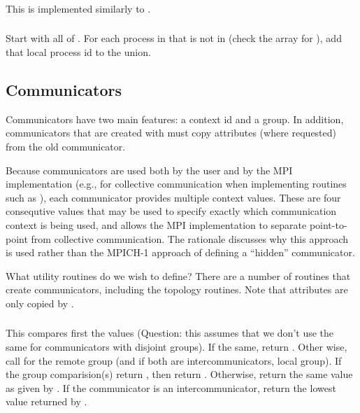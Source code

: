 \documentclass{article}
\begin{document}
\subsubsection{}

This is implemented similarly to .

\subsubsection{}

Start with all of .  For each process in  that is
not in  (check the  array for
), add that local process id to the union.

\subsection{Communicators}
\label{sec:communicators}

Communicators have two main features: a context id and a group.  In
addition, communicators that are created with  must
copy attributes (where requested) from the old communicator.

Because communicators are used both by the user and by the MPI
implementation (e.g., for collective communication when implementing
routines such as ), each communicator provides
multiple context values.  These are four consequtive values that may
be used to specify exactly which communication context is being used,
and allows the MPI implementation to separate point-to-point from
collective communication.  The rationale discusses why this approach
is used rather than the MPICH-1 approach of defining a ``hidden''
communicator. 

What utility routines do we wish to define?  There are a number of
routines that create communicators, including the topology routines.
Note that attributes are only copied by .

\subsubsection{}
This compares first the  values (Question:
this assumes that 
we don't use the same  for communicators
with disjoint 
groups).  If the same, return .  Other wise, call
 for the remote group (and if both are
intercommunicators, local group).  If the group comparision(s) return
, then return .  Otherwise, return
the same value as given by .  If the
communicator is an intercommunicator, return the lowest value returned
by .
\end{document}
